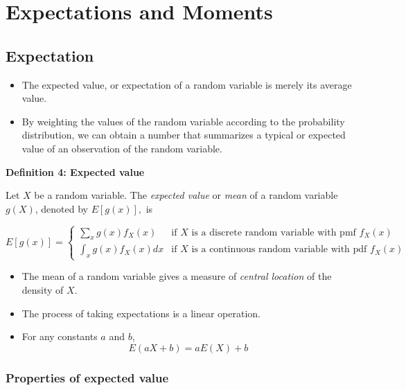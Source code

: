 \documentclass[]{book}
\begin{document}
\newpage

\hypertarget{expectations-and-moments}{%
\section{Expectations and Moments}\label{expectations-and-moments}}

\hypertarget{expectation}{%
\subsection{Expectation}\label{expectation}}

\begin{itemize}
\item
  The expected value, or expectation of a random variable is merely its average value.
\item
  By weighting the values of the random variable according to the probability distribution, we can obtain a number that summarizes a typical or expected value of an observation of the random variable.
\end{itemize}

\textbf{Definition 4: Expected value}

Let \(X\) be a random variable. The \emph{expected value} or \emph{mean} of a random variable \(g(X)\), denoted by \(E[g(x)],\) is

\begin{equation}
E[g(x)] =
\begin{cases} 
\sum_{x}g(x) f_X(x) & \text{if } X \text{ is a discrete random variable with pmf }  f_X(x) \\
\int_x g(x) f_X(x)dx & \text{if } X \text{ is a continuous random variable with pdf }  f_X(x)
\end{cases}
\end{equation}

\begin{itemize}
\item
  The mean of a random variable gives a measure of \emph{central location} of the density of \(X\).
\item
  The process of taking expectations is a linear operation.
\item
  For any constants \(a\) and \(b\),
  \[E(aX+b) = aE(X)+b\]
\end{itemize}

\hypertarget{properties-of-expected-value}{%
\subsubsection{Properties of expected value}\label{properties-of-expected-value}}
\end{document}
